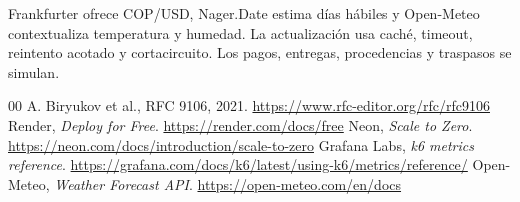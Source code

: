 \documentclass[conference]{IEEEtran}
\begin{document}
Frankfurter ofrece COP/USD, Nager.Date estima días hábiles y Open-Meteo contextualiza temperatura y humedad. La actualización usa caché, timeout, reintento acotado y cortacircuito. Los pagos, entregas, procedencias y traspasos se simulan.

\GaleriaCobertura
\GaleriaDiagnostico

\begin{thebibliography}{00}
 A. Biryukov et al., RFC 9106, 2021. \url{https://www.rfc-editor.org/rfc/rfc9106}
 Render, \emph{Deploy for Free}. \url{https://render.com/docs/free}
 Neon, \emph{Scale to Zero}. \url{https://neon.com/docs/introduction/scale-to-zero}
 Grafana Labs, \emph{k6 metrics reference}. \url{https://grafana.com/docs/k6/latest/using-k6/metrics/reference/}
 Open-Meteo, \emph{Weather Forecast API}. \url{https://open-meteo.com/en/docs}
\end{thebibliography}
\end{document}
